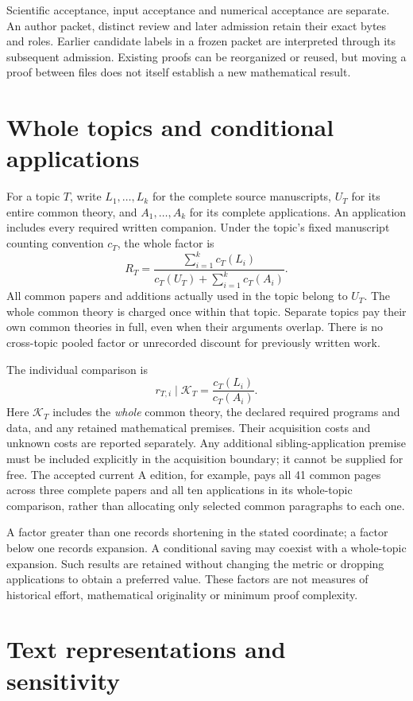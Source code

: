 \documentclass[11pt,a4paper]{article}
\begin{document}
Scientific acceptance, input acceptance and numerical acceptance are separate.
An author packet, distinct review and later admission retain their exact bytes
and roles. Earlier candidate labels in a frozen packet are interpreted through
its subsequent admission. Existing proofs can be reorganized or reused, but
moving a proof between files does not itself establish a new mathematical result.

\section{Whole topics and conditional applications}

For a topic $T$, write $L_1,\ldots,L_k$ for the complete source manuscripts,
$U_T$ for its entire common theory, and $A_1,\ldots,A_k$ for its complete
applications. An application includes every required written companion.
Under the topic's fixed manuscript counting convention $c_T$, the whole factor is
\[
 R_T=\frac{\sum_{i=1}^k c_T(L_i)}
 {c_T(U_T)+\sum_{i=1}^k c_T(A_i)}.
\]
All common papers and additions actually used in the topic belong to $U_T$.
The whole common theory is charged once within that topic. Separate topics pay
their own common theories in full, even when their arguments overlap. There is
no cross-topic pooled factor or unrecorded discount for previously written work.

The individual comparison is
\[
 r_{T,i}\mid\mathcal K_T=\frac{c_T(L_i)}{c_T(A_i)}.
\]
Here $\mathcal K_T$ includes the \emph{whole} common theory, the declared
required programs and data, and any retained mathematical premises. Their
acquisition costs and unknown costs are reported separately. Any additional
sibling-application premise must be included explicitly in the acquisition
boundary; it cannot be supplied for free. The accepted current A edition, for
example, pays all 41 common pages across three complete papers and all ten applications in its whole-topic
comparison, rather than allocating only selected common paragraphs to each one.

A factor greater than one records shortening in the stated coordinate; a factor
below one records expansion. A conditional saving may coexist with a whole-topic
expansion. Such results are retained without changing the metric or dropping
applications to obtain a preferred value. These factors are not measures of
historical effort, mathematical originality or minimum proof complexity.

\section{Text representations and sensitivity}
\end{document}

